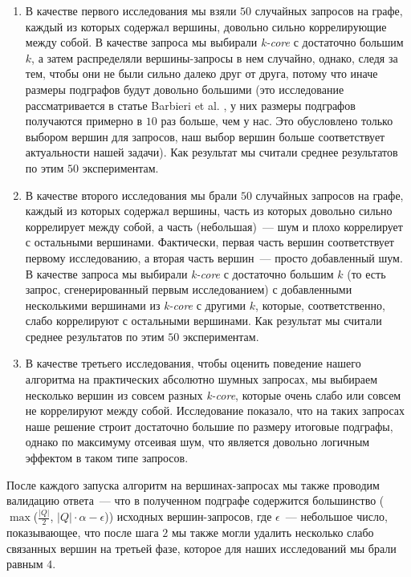 \begin{enumerate}
\item В качестве первого исследования мы взяли $50$ случайных запросов на графе, каждый из которых содержал вершины, довольно сильно коррелирующие между собой. В качестве запроса мы выбирали \textit{k-core} с достаточно большим $k$, а затем распределяли вершины-запросы в нем случайно, однако, следя за тем, чтобы они не были сильно далеко друг от друга, потому что иначе размеры подграфов будут довольно большими (это исследование рассматривается в статье Barbieri et al. \cite{Barbieri15}, у них размеры подграфов получаются примерно в $10$ раз больше, чем у нас. Это обусловлено только выбором вершин для запросов, наш выбор вершин больше соответствует актуальности нашей задачи). Как результат мы считали среднее результатов по этим $50$ экспериментам.

\item В качестве второго исследования мы брали $50$ случайных запросов на графе, каждый из которых содержал вершины, часть из которых довольно сильно коррелирует между собой, а часть (небольшая)~--- шум и плохо коррелирует с остальными вершинами. Фактически, первая часть вершин соответствует первому исследованию, а вторая часть вершин~--- просто добавленный шум. В качестве запроса мы выбирали \textit{k-core} с достаточно большим $k$ (то есть запрос, сгенерированный первым исследованием) с добавленными несколькими вершинами из \textit{k-core} с другими $k$, которые, соответственно, слабо коррелируют с остальными вершинами. Как результат мы считали среднее результатов по этим $50$ экспериментам.

\item В качестве третьего исследования, чтобы оценить поведение нашего алгоритма на практических абсолютно шумных запросах, мы выбираем несколько вершин из совсем разных \textit{k-core}, которые очень слабо или совсем не коррелируют между собой. Исследование показало, что на таких запросах наше решение строит достаточно большие по размеру итоговые подграфы, однако по максимуму отсеивая шум, что является довольно логичным эффектом в таком типе запросов.
\end{enumerate}

После каждого запуска алгоритм на вершинах-запросах мы также проводим валидацию ответа~--- что в полученном подграфе содержится большинство ($\max$($\frac{|Q|}{2}$, $|Q| \cdot \alpha - \epsilon$)) исходных вершин-запросов, где $\epsilon$~--- небольшое число, показывающее, что после шага $2$ мы также могли удалить несколько слабо связанных вершин на третьей фазе, которое для наших исследований мы брали равным $4$.

